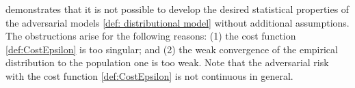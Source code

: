 \documentclass{amsart}
\theoremstyle{plain}
\numberwithin{equation}{section}\newtheorem{theorem}{Theorem}[section]
\theoremstyle{remark}
\begin{document}
 demonstrates that it is not possible to develop the desired statistical properties of the adversarial models \eqref{def: distributional model} without additional assumptions. The obstructions arise for the following reasons: (1) the cost function \eqref{def:CostEpsilon} is too singular; and (2) the weak convergence of the empirical distribution to the population one is too weak. Note that the adversarial risk with the cost function \eqref{def:CostEpsilon} is not continuous in general.
\end{document}
